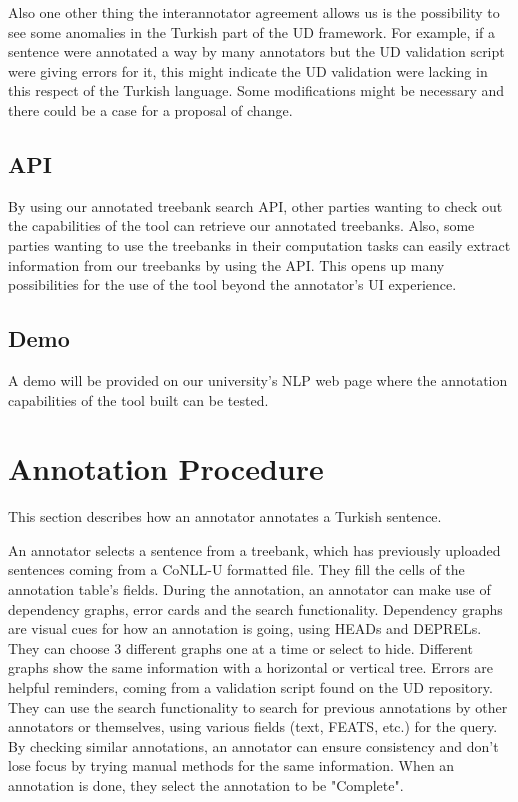 \documentclass[
]{ceurart}
\begin{document}
Also one other thing the interannotator agreement allows us is the possibility to see some anomalies in the Turkish part of the UD framework.
For example, if a sentence were annotated a way by many annotators but the UD validation script were giving errors for it, this might indicate the UD validation were lacking in this respect of the Turkish language.
Some modifications might be necessary and there could be a case for a proposal of change.

\subsection{API}
\label{sec:api}

By using our annotated treebank search API, other parties wanting to check out the capabilities of the tool can retrieve our annotated treebanks.
Also, some parties wanting to use the treebanks in their computation tasks can easily extract information from our treebanks by using the API.
This opens up many possibilities for the use of the tool beyond the annotator's UI experience.

\subsection{Demo}
\label{sec:demo}

A demo will be provided on our university's NLP web page where the annotation capabilities of the tool built can be tested.

\section{Annotation Procedure}
\label{sec:annotation}
This section describes how an annotator annotates a Turkish sentence.

An annotator selects a sentence from a treebank, which has previously uploaded sentences coming from a CoNLL-U formatted file.
They fill the cells of the annotation table's fields.
During the annotation, an annotator can make use of dependency graphs, error cards and the search functionality.
Dependency graphs are visual cues for how an annotation is going, using HEADs and DEPRELs.
They can choose 3 different graphs one at a time or select to hide.
Different graphs show the same information with a horizontal or vertical tree.
Errors are helpful reminders, coming from a validation script found on the UD repository.
They can use the search functionality to search for previous annotations by other annotators or themselves, using various fields (text, FEATS, etc.) for the query.
By checking similar annotations, an annotator can ensure consistency and don't lose focus by trying manual methods for the same information.
When an annotation is done, they select the annotation to be "Complete".
\end{document}
